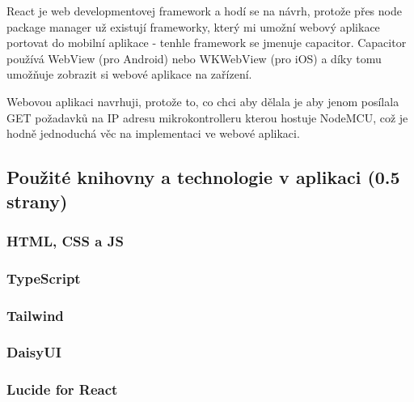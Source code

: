 
React je web developmentovej framework a hodí se na návrh, protože přes node package manager už existují frameworky, který mi umožní webový aplikace portovat do mobilní aplikace - tenhle framework se jmenuje capacitor. Capacitor používá WebView (pro Android) nebo WKWebView (pro iOS) a díky tomu umožňuje zobrazit si webové aplikace na zařízení.\cite{CapacitorDocumentationFAQ}

Webovou aplikaci navrhuji, protože to, co chci aby dělala je aby jenom posílala GET požadavků na IP adresu mikrokontrolleru kterou hostuje NodeMCU, což je hodně jednoduchá věc na implementaci ve webové aplikaci.


\subsection{Použité knihovny a technologie v aplikaci (0.5 strany)}

\subsubsection{HTML, CSS a JS}

\subsubsection{TypeScript}

\subsubsection{Tailwind}

\subsubsection{DaisyUI}

\subsubsection{Lucide for React}

